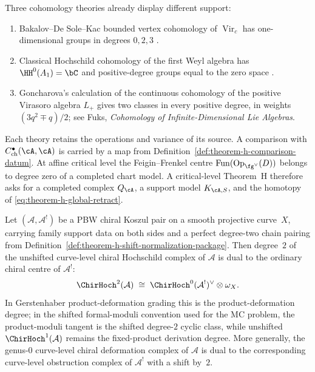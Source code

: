\begin{remark}
\label{rem:critical-level-dimensional-divergence}
Three cohomology theories already display different support:
\begin{enumerate}[label=\textup{(\roman*)},nosep]
\item Bakalov--De Sole--Kac bounded vertex cohomology of
 \(\operatorname{Vir}_c\) has one-dimensional groups in degrees
 \(0,2,3\) \cite[Theorem~7.2]{BDSK21}.
\item Classical Hochschild cohomology of the first Weyl algebra has
 \(\HH^0(A_1)=\bC\) and positive-degree groups equal to the zero
 space \cite{Sridharan61}.
\item Goncharova's calculation of the continuous cohomology of the
 positive Virasoro algebra \(L_+\) gives two classes in every positive
 degree, in weights \((3q^2\mp q)/2\); see Fuks,
 \emph{Cohomology of Infinite-Dimensional Lie Algebras}.
\end{enumerate}
Each theory retains the operations and variance of its source.  A
comparison with \(C^\bullet_{\mathrm{ch}}(\cA,\cA)\) is carried by a
map from Definition~\ref{def:theorem-h-comparison-datum}.  At affine
critical level the Feigin--Frenkel centre
\(\operatorname{Fun}(\operatorname{Op}_{\fg^\vee}(D))\) belongs to
degree zero of a completed chart model.  A critical-level Theorem~H
therefore asks for a completed complex \(Q_\cA\), a support model
\(K_{\cA,S}\), and the homotopy of
\eqref{eq:theorem-h-global-retract}.
\end{remark}

\begin{corollary}\label{cor:def-obs-exchange-genus0}
Let $(\mathcal{A}, \mathcal{A}^!)$ be a PBW chiral Koszul pair on a
smooth projective curve~$X$, carrying family support data on both
sides and a perfect degree-two chain pairing from
Definition~\textup{\ref{def:theorem-h-shift-normalization-package}}.
Then degree~$2$ of the unshifted curve-level chiral Hochschild complex of
$\mathcal{A}$ is dual to the ordinary chiral centre of
$\mathcal{A}^!$:
\begin{equation}\label{eq:def-obs-genus0}
\ChirHoch^2(\mathcal{A}) \;\cong\; \ChirHoch^0(\mathcal{A}^!)^{\vee} \otimes \omega_X.
\end{equation}
In Gerstenhaber product-deformation grading this is the
product-deformation degree; in the shifted formal-moduli convention
used for the MC problem, the product-moduli tangent is the shifted
degree-$2$ cyclic class, while unshifted
$\ChirHoch^1(\mathcal A)$ remains the fixed-product derivation degree.
More generally, the genus-$0$ curve-level chiral deformation complex of
$\mathcal{A}$ is dual to the corresponding curve-level obstruction
complex of $\mathcal{A}^!$ with a shift by~$2$.
\end{corollary}

